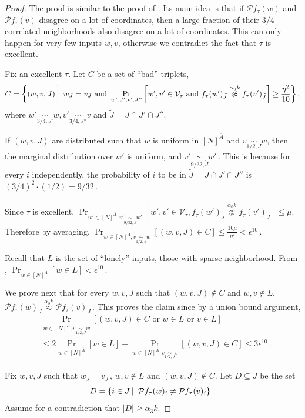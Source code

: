 \documentclass[11pt]{article}
\numberwithin{equation}{section}
\theoremstyle{definition}
\theoremstyle{plain}
\newcommand{\Prob}[2][]{\Pr_{{#1}}\left[#2\right]} %
\newcommand{\abs}[1]{\lvert#1\rvert} %
\newcommand\sett[2]{\left\{ #1 \left| \; \vphantom{#1 #2} \right. #2  \right\}} %
\newcommand\f{f} %
\newcommand\bh{\mathcal{P}\f_\tau} %
\newcommand\neql[1]{\stackrel{{#1}}{ \approx}} %
\newcommand\neqg[1]{\stackrel{{#1}}{ \not\approx}} %
\newcommand\cons{\mathcal{V}} %
\newcommand\cor[1]{\underset{\scriptscriptstyle#1}{\sim}} %
\newcommand\rest[1]{{\bar{#1}}}  %
\begin{document}
\begin{proof}
    The proof is similar to the proof of . Its main idea is that if $\bh(w)$ and $\bh(v)$ disagree on a lot of coordinates, then a large fraction of their 
%
%
$3/4$-correlated  %
neighborhoods also disagree on a lot of coordinates. This can only happen for very few inputs $w,v$, otherwise we contradict the fact that $\tau$ is excellent.

	Fix an excellent $\tau$.
	Let $C$ be a set of ``bad'' triplets,
	\[ C = \sett{(w,v,J)}{w_J=v_J\textrm{ and }\Prob[w',J',v',J'']{w',v'\in \cons_\tau\textrm{ and } \f_\tau(w')_{\tilde{J}}\neqg{\alpha_0 k} \f_\tau(v')_{\tilde{J}}} \geq \frac{\eta^2}{10}}, \]
where $w'\cor{3/4,J'}w,v'\cor{3/4,J''} v$ and $\tilde{J} = J\cap J'\cap J''$.
	
	If $(w,v, J)$ are distributed such that $w$ is uniform in $[N]^{\bar{A}}$ and $v\cor{1/2,J}{w}$, then the marginal distribution over $w'$ is uniform, and  $v'\cor{9/32,\tilde{J}}{w'}\,.$ This is because for every $i$ independently, the probability of $i$ to be in $\tilde{J} = J\cap J' \cap J''$ is
$(3/4)^2\cdot (1/2) = 9/32$\,.  %

	Since $\tau$ is excellent, $\Prob[{w'\in[N]^{\bar{A}},v'\cor{9/32,\tilde{J}}w'}]{w',v'\in \cons_\tau, \f_\tau(w')_{\tilde{J}}\neqg{\alpha_0 k} \f_\tau(v')_{\tilde{J}}} \leq \mu$. Therefore by averaging, $\Prob[{w\in[N]^{\bar
	A},v\cor{1/2,J}w}]{(w,v,J)\in C}\leq \frac{10\mu}{\eta^2}<\epsilon^{10}$\,. 
	
	Recall that $L$ is the set of ``lonely'' inputs, those with sparse neighborhood. From , $\Prob[{w\in [N]^{\rest{A}}}]{w\in L}<\epsilon^{10}$\,.
	
    We prove next that for every $w,v,J$ such that $(w,v,J)\notin C$ and $w,v\notin L$, $\bh(w)_J \neql{\alpha_3 k}\bh(v)_J$\,. This proves the claim since by a union bound argument, 
%
%
\begin{align*}
& \Prob[{w\in[N]^{\bar{A}},v\cor{1/2,J}w}]{(w,v,J)\in C \textrm{ or } w\in L \textrm{ or } v\in L} \\
&\leq 2\Pr_{w\in[N]^{\rest{A}}}[w\in L]+ \Prob[{w\in[N]^{\bar A},v\cor{1/2,J}v}]{(w,v,J)\in C} \leq 3\epsilon^{10}\,.
\end{align*}
	
	Fix $w,v,J$ such that $w_J = v_J$\,, $w,v\notin L$ and $(w,v,J)\notin C$. Let $D\subseteq J$ be the set
	\[ D = \sett{i\in J}{\bh(w)_i \neq \bh(v)_i}\,. \]
Assume %
for  %
a contradiction that $\abs{D}\geq \alpha_3 k$.
	

\end{proof}
\end{document}
